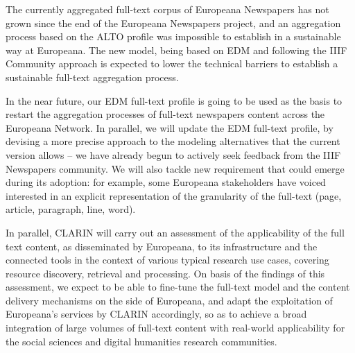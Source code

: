 \documentclass[a4paper,UKenglish,cleveref, autoref]{oasics-v2019}
\begin{document}
The currently aggregated full-text corpus of Europeana Newspapers has not grown since the end of the Europeana Newspapers project, and an aggregation process based on the ALTO profile was impossible to establish in a sustainable way at Europeana. The new model, being based on EDM and following the IIIF Community approach is expected to lower the technical barriers to establish a sustainable full-text aggregation process. 

In the near future, our EDM full-text profile is going to be used as the basis to restart the aggregation processes of full-text newspapers content across the Europeana Network. In parallel, we will update the EDM full-text profile, by devising a more precise approach to the modeling alternatives that the current version allows – we have already begun to actively seek feedback from the IIIF Newspapers community. We will also tackle new requirement that could emerge during its adoption: for example, some Europeana stakeholders have voiced interested in an explicit representation of the granularity of the full-text (page, article, paragraph, line, word).

In parallel, CLARIN will carry out an assessment of the applicability of the full text content, as disseminated by Europeana, to its infrastructure and the connected tools in the context of various typical research use cases, covering resource discovery, retrieval and processing. On basis of the findings of this assessment, we expect to be able to fine-tune the full-text model and the content delivery mechanisms on the side of Europeana, and adapt the exploitation of Europeana's services by CLARIN accordingly, so as to achieve a broad integration of large volumes of full-text content with real-world applicability for the social sciences and digital humanities research communities.




\end{document}
